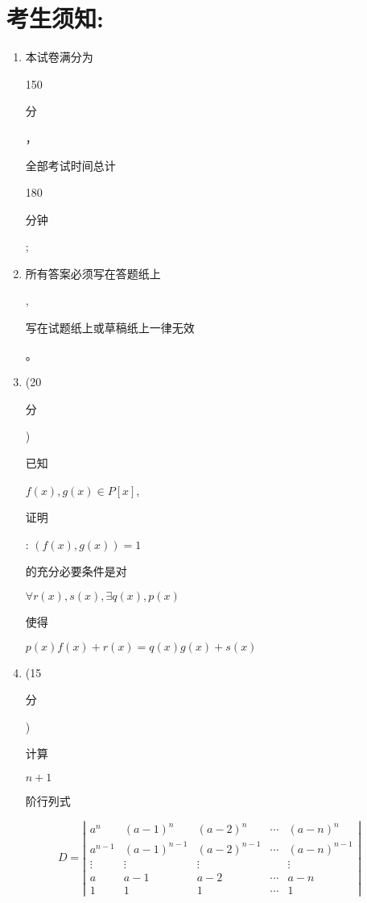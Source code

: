 \documentclass[10pt]{article}
\begin{document}
\section{考生须知:}
\begin{enumerate}
  \item \begin{CJK}{UTF8}{mj}本试卷满分为\end{CJK} 150 \begin{CJK}{UTF8}{mj}分\end{CJK}，\begin{CJK}{UTF8}{mj}全部考试时间总计\end{CJK} 180 \begin{CJK}{UTF8}{mj}分钟\end{CJK};

  \item \begin{CJK}{UTF8}{mj}所有答案必须写在答题纸上\end{CJK}, \begin{CJK}{UTF8}{mj}写在试题纸上或草稿纸上一律无效\end{CJK}。

  \item (20 \begin{CJK}{UTF8}{mj}分\end{CJK}) \begin{CJK}{UTF8}{mj}已知\end{CJK} $f(x), g(x) \in P[x]$, \begin{CJK}{UTF8}{mj}证明\end{CJK}: $(f(x), g(x))=1$ \begin{CJK}{UTF8}{mj}的充分必要条件是对\end{CJK} $\forall r(x), s(x), \exists q(x), p(x)$ \begin{CJK}{UTF8}{mj}使得\end{CJK} $p(x) f(x)+r(x)=q(x) g(x)+s(x)$

  \item (15 \begin{CJK}{UTF8}{mj}分\end{CJK}) \begin{CJK}{UTF8}{mj}计算\end{CJK} $n+1$ \begin{CJK}{UTF8}{mj}阶行列式\end{CJK}

\end{enumerate}
$$
D=\left|\begin{array}{ccccc}
a^{n} & (a-1)^{n} & (a-2)^{n} & \cdots & (a-n)^{n} \\
a^{n-1} & (a-1)^{n-1} & (a-2)^{n-1} & \cdots & (a-n)^{n-1} \\
\vdots & \vdots & \vdots & & \vdots \\
a & a-1 & a-2 & \cdots & a-n \\
1 & 1 & 1 & \cdots & 1
\end{array}\right|
$$
\end{document}
